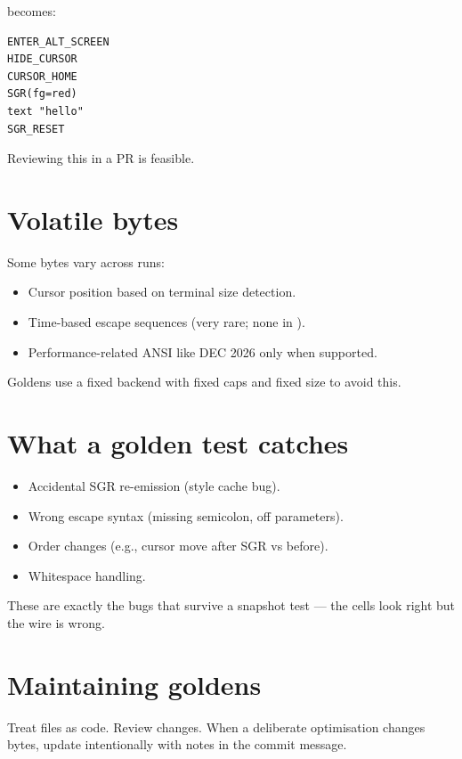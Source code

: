 becomes:

\begin{lstlisting}
ENTER_ALT_SCREEN
HIDE_CURSOR
CURSOR_HOME
SGR(fg=red)
text "hello"
SGR_RESET
\end{lstlisting}

Reviewing this in a PR is feasible.

\section{Volatile bytes}

Some bytes vary across runs:

\begin{itemize}[leftmargin=*]
  \item Cursor position based on terminal size detection.
  \item Time-based escape sequences (very rare; none in
    \maya{}).
  \item Performance-related ANSI like DEC 2026 only
    when supported.
\end{itemize}

Goldens use a fixed backend with fixed caps and fixed size
to avoid this.

\section{What a golden test catches}

\begin{itemize}[leftmargin=*]
  \item Accidental SGR re-emission (style cache bug).
  \item Wrong escape syntax (missing semicolon, off
    parameters).
  \item Order changes (e.g., cursor move after SGR vs
    before).
  \item Whitespace handling.
\end{itemize}

These are exactly the bugs that survive a snapshot test ---
the cells look right but the wire is wrong.

\section{Maintaining goldens}

Treat  files as code. Review changes. When a
deliberate optimisation changes bytes, update intentionally
with notes in the commit message.

